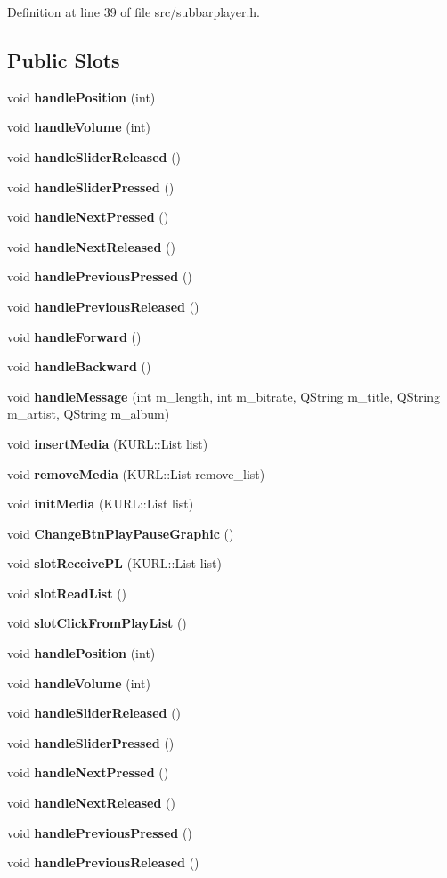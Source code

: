 Definition at line 39 of file src/subbarplayer.h.\subsection*{Public Slots}
\begin{CompactItemize}
\item 
void {\bf handle\-Position} (int)
\item 
void {\bf handle\-Volume} (int)
\item 
void {\bf handle\-Slider\-Released} ()
\item 
void {\bf handle\-Slider\-Pressed} ()
\item 
void {\bf handle\-Next\-Pressed} ()
\item 
void {\bf handle\-Next\-Released} ()
\item 
void {\bf handle\-Previous\-Pressed} ()
\item 
void {\bf handle\-Previous\-Released} ()
\item 
void {\bf handle\-Forward} ()
\item 
void {\bf handle\-Backward} ()
\item 
void {\bf handle\-Message} (int m\_\-length, int m\_\-bitrate, QString m\_\-title, QString m\_\-artist, QString m\_\-album)
\item 
void {\bf insert\-Media} (KURL::List list)
\item 
void {\bf remove\-Media} (KURL::List remove\_\-list)
\item 
void {\bf init\-Media} (KURL::List list)
\item 
void {\bf Change\-Btn\-Play\-Pause\-Graphic} ()
\item 
void {\bf slot\-Receive\-PL} (KURL::List list)
\item 
void {\bf slot\-Read\-List} ()
\item 
void {\bf slot\-Click\-From\-Play\-List} ()
\item 
void {\bf handle\-Position} (int)
\item 
void {\bf handle\-Volume} (int)
\item 
void {\bf handle\-Slider\-Released} ()
\item 
void {\bf handle\-Slider\-Pressed} ()
\item 
void {\bf handle\-Next\-Pressed} ()
\item 
void {\bf handle\-Next\-Released} ()
\item 
void {\bf handle\-Previous\-Pressed} ()
\item 
void {\bf handle\-Previous\-Released} ()

\end{CompactItemize}
